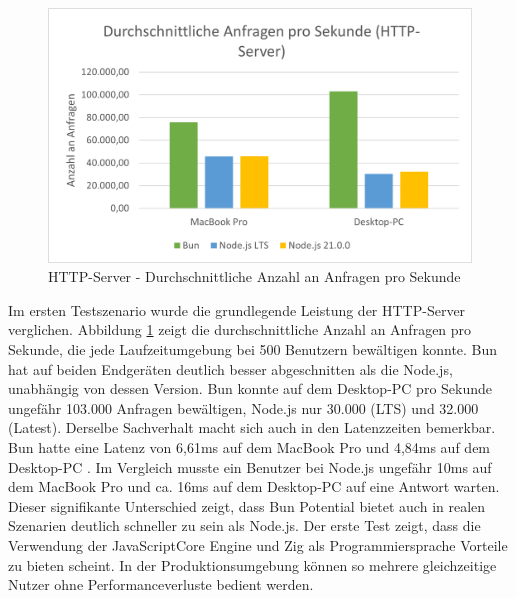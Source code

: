 \begin{figure}[h]
	\centering
	\includegraphics[width=\linewidth]{./images/httpServerAverageRequestsPerSecond.png}
	\caption{HTTP-Server - Durchschnittliche Anzahl an Anfragen pro Sekunde}
	\label{fig:httpServerAverageRequestsPerSecond}
\end{figure}


\noindent
Im ersten Testszenario wurde die grundlegende Leistung der HTTP-Server verglichen. Abbildung \ref{fig:httpServerAverageRequestsPerSecond} zeigt die durchschnittliche Anzahl an Anfragen pro Sekunde, die jede Laufzeitumgebung bei 500 Benutzern bewältigen konnte. Bun hat auf beiden Endgeräten deutlich besser abgeschnitten als die Node.js, unabhängig von dessen Version. Bun konnte auf dem Desktop-PC pro Sekunde ungefähr 103.000 Anfragen bewältigen, Node.js nur 30.000 (LTS) und 32.000 (Latest). Derselbe Sachverhalt macht sich auch in den Latenzzeiten bemerkbar. Bun hatte eine Latenz von 6,61ms auf dem MacBook Pro und 4,84ms auf dem Desktop-PC . Im Vergleich musste ein Benutzer bei Node.js ungefähr 10ms auf dem MacBook Pro und ca. 16ms auf dem Desktop-PC auf eine Antwort warten.\newline
Dieser signifikante Unterschied zeigt, dass Bun Potential bietet auch in realen Szenarien deutlich schneller zu sein als Node.js. Der erste Test zeigt, dass die Verwendung der JavaScriptCore Engine und Zig als Programmiersprache Vorteile zu bieten scheint. In der Produktionsumgebung können so mehrere gleichzeitige Nutzer ohne Performanceverluste bedient werden.\\

